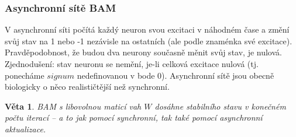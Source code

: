 \documentclass[11pt]{report} %
\newtheorem{theorem}{Věta}[section]
\numberwithin{equation}{section}
\begin{document}
\subsubsection{Asynchronní sítě BAM}
V asynchronní síti počítá každý neuron svou excitaci v náhodném čase a změní svůj stav na 1 nebo -1 nezávisle na ostatních (ale podle znaménka své excitace). Pravděpodobnost, že budou dva neurony současně měnit svůj stav, je nulová. Zjednodušení: stav neuronu se nemění, je-li celková excitace nulová (tj. ponecháme $signum$ nedefinovanou v bode 0). Asynchronní sítě jsou obecně biologicky o něco realističtější než synchronní.

\begin{theorem}
BAM s libovolnou maticí vah $W$ dosáhne stabilního stavu v konečném počtu iterací -- a to jak pomocí synchronní, tak také pomocí asynchronní aktualizace.
\end{theorem}
\end{document}
